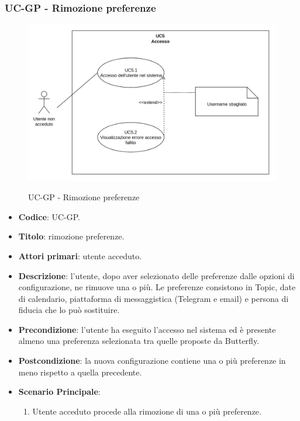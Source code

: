 \subsubsection{UC\theuccount-GP - Rimozione preferenze}
		\begin{figure}[H]
			\centering
				\includegraphics[width=\columnwidth]{img/UC5.png}\\
			\caption{UC\theuccount-GP - Rimozione preferenze}
		\end{figure}
	\begin{itemize}
		\item \textbf{Codice}: UC\theuccount-GP.
		\item \textbf{Titolo}: rimozione preferenze.
		\item \textbf{Attori primari}: utente acceduto.
		\item \textbf{Descrizione}: l’utente, dopo aver selezionato delle preferenze dalle opzioni
		di configurazione, ne rimuove una o più. Le preferenze consistono in Topic, date di calendario,
		piattaforma di messaggistica (Telegram e email) e persona di fiducia che lo può sostituire.
		\item \textbf{Precondizione}: l’utente ha eseguito l'accesso nel sistema ed è presente almeno
		una preferenza selezionata tra quelle proposte da Butterfly.
		\item \textbf{Postcondizione}: la nuova configurazione contiene una o più preferenze in meno rispetto
		a quella precedente.
		\item \textbf{Scenario Principale}:
		\begin{enumerate}
			\item Utente acceduto procede alla rimozione di una o più preferenze.
		\end{enumerate}
	\end{itemize}


